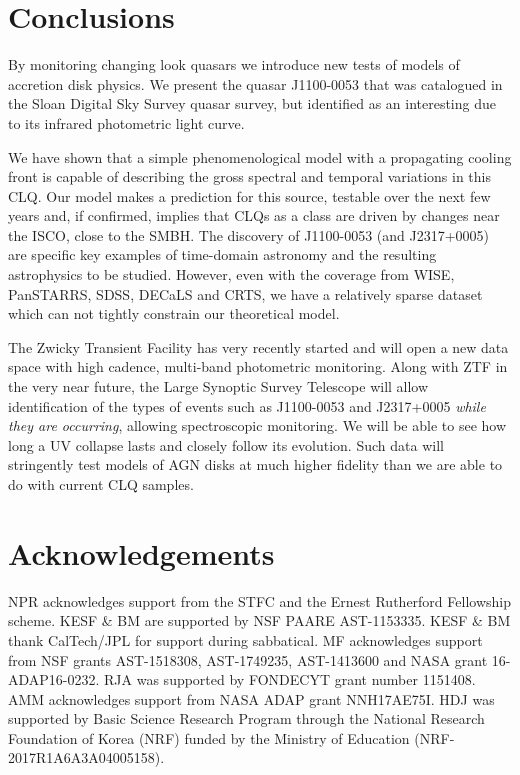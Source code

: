 \documentclass[a4paper,fleqn,usenatbib]{mnras}
\begin{document}
\section{Conclusions} 
By monitoring changing look quasars we introduce new tests of models
of accretion disk physics. We present the quasar J1100-0053 that was
catalogued in the Sloan Digital Sky Survey quasar survey, but
identified as an interesting due to its infrared photometric light
curve.

We have shown that a simple phenomenological model with a propagating
cooling front is capable of describing the gross spectral and temporal
variations in this CLQ. Our model makes a prediction for this source,
testable over the next few years and, if confirmed, implies that CLQs
as a class are driven by changes near the ISCO, close to the SMBH. The
discovery of J1100-0053 (and J2317+0005) are specific key examples of
time-domain astronomy and the resulting astrophysics to be
studied. However, even with the coverage from WISE, PanSTARRS, SDSS,
DECaLS and CRTS, we have a relatively sparse dataset which can not
tightly constrain our theoretical model.

The Zwicky Transient
Facility \citep[ZTF; ][]{Bellm2014} has very recently started and will
open a new data space with high cadence, multi-band photometric
monitoring. Along with ZTF in the very near future, the Large Synoptic
Survey Telescope \citep{Ivezic2008, LSST_ScienceBookV2} will allow
identification of the types of events such as J1100-0053 and
J2317+0005 \emph{while they are occurring}, allowing spectroscopic
monitoring. We will be able to see how long a UV collapse lasts and
closely follow its evolution.  Such data will stringently test models
of AGN disks at much higher fidelity than we are able to do with
current CLQ samples.

\smallskip
\smallskip


\smallskip
\smallskip


\section*{Acknowledgements}
NPR acknowledges support from the STFC and the Ernest Rutherford
Fellowship scheme.  KESF \& BM are supported by NSF PAARE
AST-1153335. KESF \& BM thank CalTech/JPL for support during
sabbatical.  MF acknowledges support from NSF grants AST-1518308,
AST-1749235, AST-1413600 and NASA grant 16-ADAP16-0232.  RJA was
supported by FONDECYT grant number 1151408. AMM acknowledges support
from NASA ADAP grant NNH17AE75I. HDJ was supported by Basic Science
Research Program through the National Research Foundation of Korea
(NRF) funded by the Ministry of Education (NRF-2017R1A6A3A04005158).
\end{document}
